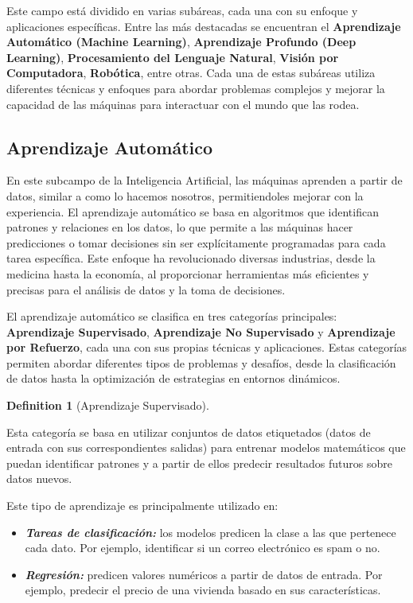 \documentclass[
  letterpaper,
  DIV=11,
  numbers=noendperiod]{scrreprt}
\providecommand{\tightlist}{%
  \setlength{\itemsep}{0pt}\setlength{\parskip}{0pt}}
\theoremstyle{definition}
\newtheorem{definition}{Definition}[chapter]
\theoremstyle{remark}
\begin{document}
Este campo está dividido en varias subáreas, cada una con su enfoque y
aplicaciones específicas. Entre las más destacadas se encuentran el
\textbf{Aprendizaje Automático (Machine Learning)}, \textbf{Aprendizaje
Profundo (Deep Learning)}, \textbf{Procesamiento del Lenguaje Natural},
\textbf{Visión por Computadora}, \textbf{Robótica}, entre otras. Cada
una de estas subáreas utiliza diferentes técnicas y enfoques para
abordar problemas complejos y mejorar la capacidad de las máquinas para
interactuar con el mundo que las rodea.

\subsection{Aprendizaje Automático}\label{aprendizaje-automuxe1tico}

En este subcampo de la Inteligencia Artificial, las máquinas aprenden a
partir de datos, similar a como lo hacemos nosotros, permitiendoles
mejorar con la experiencia. El aprendizaje automático se basa en
algoritmos que identifican patrones y relaciones en los datos, lo que
permite a las máquinas hacer predicciones o tomar decisiones sin ser
explícitamente programadas para cada tarea específica. Este enfoque ha
revolucionado diversas industrias, desde la medicina hasta la economía,
al proporcionar herramientas más eficientes y precisas para el análisis
de datos y la toma de decisiones.

El aprendizaje automático se clasifica en tres categorías principales:
\textbf{Aprendizaje Supervisado}, \textbf{Aprendizaje No Supervisado} y
\textbf{Aprendizaje por Refuerzo}, cada una con sus propias técnicas y
aplicaciones. Estas categorías permiten abordar diferentes tipos de
problemas y desafíos, desde la clasificación de datos hasta la
optimización de estrategias en entornos dinámicos.

\begin{definition}[Aprendizaje
Supervisado]\protect\hypertarget{def-sub}{}\label{def-sub}

Esta categoría se basa en utilizar conjuntos de datos etiquetados (datos
de entrada con sus correspondientes salidas) para entrenar modelos
matemáticos que puedan identificar patrones y a partir de ellos predecir
resultados futuros sobre datos nuevos.

Este tipo de aprendizaje es principalmente utilizado en:

\begin{itemize}
\tightlist
\item
  \textbf{\emph{Tareas de clasificación:}} los modelos predicen la clase
  a las que pertenece cada dato. Por ejemplo, identificar si un correo
  electrónico es spam o no.
\item
  \textbf{\emph{Regresión:}} predicen valores numéricos a partir de
  datos de entrada. Por ejemplo, predecir el precio de una vivienda
  basado en sus características.
\end{itemize}

\end{definition}
\end{document}
